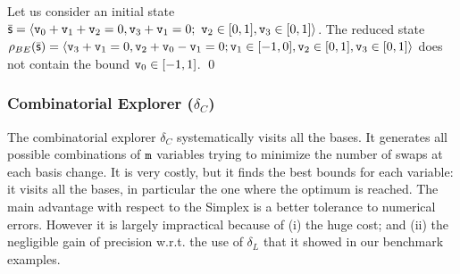 \documentclass[sttt]{svjour}
\begin{document}
\begin{example}
Let us consider an initial state $\bar{\mathsf{\mathsf{s}}} = \langle  \mathtt{v}_0 + \mathtt{v}_1 + \mathtt{v}_2 = 0, \mathtt{v}_3 + \mathtt{v}_1 = 0;\ \mathtt{v}_2 \in [0,1], \mathtt{v}_3 \in [0,1] \rangle$.
The reduced state $\rho_{BE}(\bar{\mathsf{\mathsf{s}}}) = \langle \mathtt{v}_3 + \mathtt{v}_1 = 0, \mathtt{v}_2 + \mathtt{v}_0 - \mathtt{v}_1 = 0 ; \mathtt{v}_1 \in [-1,0], \mathtt{v}_2 \in [0,1], \mathtt{v}_3 \in [0,1]  \rangle$ does not contain the bound $\mathtt{v}_0 \in [-1, 1]$. \qed
\end{example}



\subsubsection{Combinatorial Explorer ($\delta_C$)} The combinatorial explorer $\delta_C$ systematically visits all the bases.
It generates all possible combinations of $\mathtt{m}$ variables trying to minimize the number of swaps at each basis change. 
It is very costly, but it finds the best bounds for each variable: it visits all the bases, in particular the one where the optimum is reached.
The main advantage with respect to the Simplex is a better tolerance to numerical errors.
However it is largely impractical because of (i) the huge cost; and (ii) the negligible gain of precision w.r.t. the use of $\delta_L$ that it showed in our benchmark examples.



\end{document}
